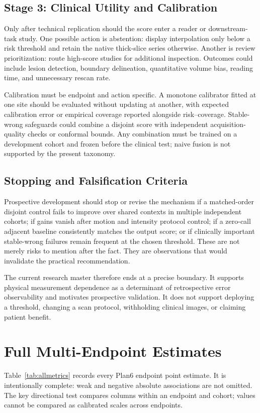 \documentclass[journal,10pt]{IEEEtran}
\begin{document}
\subsection{Stage 3: Clinical Utility and Calibration}
Only after technical replication should the score enter a reader or downstream-task study. One possible action is abstention: display interpolation only below a risk threshold and retain the native thick-slice series otherwise. Another is review prioritization: route high-score studies for additional inspection. Outcomes could include lesion detection, boundary delineation, quantitative volume bias, reading time, and unnecessary rescan rate.

Calibration must be endpoint and action specific. A monotone calibrator fitted at one site should be evaluated without updating at another, with expected calibration error or empirical coverage reported alongside risk--coverage. Stable-wrong safeguards could combine a disjoint score with independent acquisition-quality checks or conformal bounds. Any combination must be trained on a development cohort and frozen before the clinical test; naive fusion is not supported by the present taxonomy.

\subsection{Stopping and Falsification Criteria}
Prospective development should stop or revise the mechanism if a matched-order disjoint control fails to improve over shared contexts in multiple independent cohorts; if gains vanish after motion and intensity protocol control; if a zero-call adjacent baseline consistently matches the output score; or if clinically important stable-wrong failures remain frequent at the chosen threshold. These are not merely risks to mention after the fact. They are observations that would invalidate the practical recommendation.

The current research master therefore ends at a precise boundary. It supports physical measurement dependence as a determinant of retrospective error observability and motivates prospective validation. It does not support deploying a threshold, changing a scan protocol, withholding clinical images, or claiming patient benefit.

\section{Full Multi-Endpoint Estimates}
Table~\ref{tab:allmetrics} records every Plan6 endpoint point estimate. It is intentionally complete: weak and negative absolute associations are not omitted. The key directional test compares columns within an endpoint and cohort; values cannot be compared as calibrated scales across endpoints.
\end{document}
